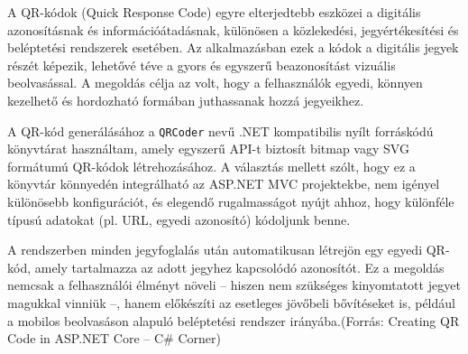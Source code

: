 \indent A QR-kódok (Quick Response Code) egyre elterjedtebb eszközei a digitális azonosításnak és információátadásnak, különösen a közlekedési, jegyértékesítési és beléptetési rendszerek esetében. Az alkalmazásban ezek a kódok a digitális jegyek részét képezik, lehetővé téve a gyors és egyszerű beazonosítást vizuális beolvasással. A megoldás célja az volt, hogy a felhasználók egyedi, könnyen kezelhető és hordozható formában juthassanak hozzá jegyeikhez.

A QR-kód generálásához a \texttt{QRCoder} nevű .NET kompatibilis nyílt forráskódú könyvtárat használtam, amely egyszerű API-t biztosít bitmap vagy SVG formátumú QR-kódok létrehozásához. A választás mellett szólt, hogy ez a könyvtár könnyedén integrálható az ASP.NET MVC projektekbe, nem igényel különösebb konfigurációt, és elegendő rugalmasságot nyújt ahhoz, hogy különféle típusú adatokat (pl. URL, egyedi azonosító) kódoljunk benne.

A rendszerben minden jegyfoglalás után automatikusan létrejön egy egyedi QR-kód, amely tartalmazza az adott jegyhez kapcsolódó azonosítót. Ez a megoldás nemcsak a felhasználói élményt növeli – hiszen nem szükséges kinyomtatott jegyet magukkal vinniük –, hanem előkészíti az esetleges jövőbeli bővítéseket is, például a mobilos beolvasáson alapuló beléptetési rendszer irányába.(Forrás: Creating QR Code in ASP.NET Core – C\# Corner)
